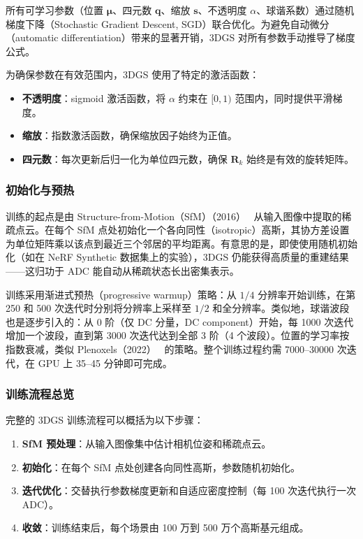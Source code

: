 所有可学习参数（位置 $\boldsymbol{\mu}$、四元数 $\mathbf{q}$、缩放 $\mathbf{s}$、不透明度 $\alpha$、球谐系数）通过随机梯度下降（Stochastic Gradient Descent, SGD）联合优化。为避免自动微分（automatic differentiation）带来的显著开销，3DGS 对所有参数手动推导了梯度公式。

为确保参数在有效范围内，3DGS 使用了特定的激活函数：
\begin{itemize}
\item \textbf{不透明度}：sigmoid 激活函数，将 $\alpha$ 约束在 $[0, 1)$ 范围内，同时提供平滑梯度。
\item \textbf{缩放}：指数激活函数，确保缩放因子始终为正值。
\item \textbf{四元数}：每次更新后归一化为单位四元数，确保 $\mathbf{R}_k$ 始终是有效的旋转矩阵。
\end{itemize}

\subsubsection{初始化与预热}

训练的起点是由 Structure-from-Motion（SfM）（2016）~\cite{schoenberger2016sfm} 从输入图像中提取的稀疏点云。在每个 SfM 点处初始化一个各向同性（isotropic）高斯，其协方差设置为单位矩阵乘以该点到最近三个邻居的平均距离。有意思的是，即使使用随机初始化（如在 NeRF Synthetic 数据集上的实验），3DGS 仍能获得高质量的重建结果——这归功于 ADC 能自动从稀疏状态长出密集表示。

训练采用渐进式预热（progressive warmup）策略：从 $1/4$ 分辨率开始训练，在第 250 和 500 次迭代时分别将分辨率上采样至 $1/2$ 和全分辨率。类似地，球谐波段也是逐步引入的：从 0 阶（仅 DC 分量，DC component）开始，每 1000 次迭代增加一个波段，直到第 3000 次迭代达到全部 3 阶（4 个波段）。位置的学习率按指数衰减，类似 Plenoxels（2022）~\cite{plenoxels} 的策略。整个训练过程约需 7000--30000 次迭代，在 GPU 上 35--45 分钟即可完成。

\subsubsection{训练流程总览}

完整的 3DGS 训练流程可以概括为以下步骤：
\begin{enumerate}
\item \textbf{SfM 预处理}：从输入图像集中估计相机位姿和稀疏点云。
\item \textbf{初始化}：在每个 SfM 点处创建各向同性高斯，参数随机初始化。
\item \textbf{迭代优化}：交替执行参数梯度更新和自适应密度控制（每 100 次迭代执行一次 ADC）。
\item \textbf{收敛}：训练结束后，每个场景由 100 万到 500 万个高斯基元组成。
\end{enumerate}

